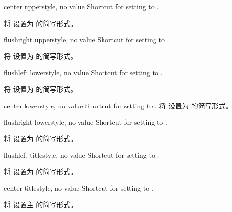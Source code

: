 \begin{docTcbKey}[][doc updated=2015-05-07]{center upper}{}{style, no value}
Shortcut for setting  to .

将  设置为  的简写形式。
\end{docTcbKey}

\begin{docTcbKey}[][doc updated=2015-05-07]{flushright upper}{}{style, no value}
Shortcut for setting  to .

将  设置为  的简写形式。
\end{docTcbKey}

\begin{docTcbKey}[][doc updated=2015-05-07]{flushleft lower}{}{style, no value}
Shortcut for setting  to .

将  设置为  的简写形式。
\end{docTcbKey}

\begin{docTcbKey}[][doc updated=2015-05-07]{center lower}{}{style, no value}
Shortcut for setting  to .
将  设置为  的简写形式。
\end{docTcbKey}

\begin{docTcbKey}[][doc updated=2015-05-07]{flushright lower}{}{style, no value}
Shortcut for setting  to .

将  设置为  的简写形式。
\end{docTcbKey}




\begin{docTcbKey}[][doc updated=2015-05-07]{flushleft title}{}{style, no value}
Shortcut for setting  to .

将  设置为  的简写形式。
\end{docTcbKey}

\begin{docTcbKey}[][doc updated=2015-05-07]{center title}{}{style, no value}
Shortcut for setting  to .

将  设置主  的简写形式。
\end{docTcbKey}

